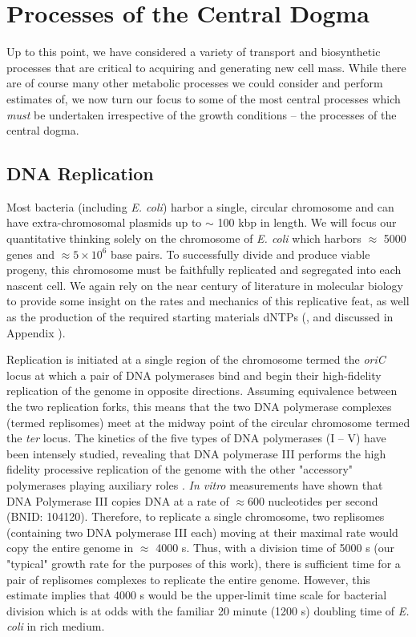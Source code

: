 \section{Processes of the Central Dogma}
Up to this point, we have considered a variety of transport and biosynthetic
processes that are critical to acquiring and generating new cell mass. While
there are of course many other metabolic processes we could consider and
perform estimates of, we now turn our focus to some of the most central processes
which \textit{must} be undertaken irrespective of the growth conditions --
the processes of the central dogma.


\subsection{DNA Replication}
Most bacteria (including \textit{E. coli}) harbor a single, circular chromosome
and can have extra-chromosomal plasmids up to $\sim$ 100 kbp in length. We will focus
our quantitative thinking solely on the chromosome of \textit{E. coli} which
harbors $\approx$ 5000 genes and $\approx 5\times 10^6$ base pairs. To
successfully divide and produce viable progeny, this chromosome must be
faithfully replicated and segregated into each nascent cell. We again rely on
the near century of literature in molecular biology to provide some insight on
the rates and mechanics of this replicative feat, as well as the production of the
required starting materials dNTPs (, and discussed in Appendix ).


Replication is initiated at a
single region of the chromosome termed the \textit{oriC} locus at which a pair
of DNA polymerases bind and begin their high-fidelity replication of the genome
in opposite directions. Assuming equivalence between the two replication forks,
this means that the two DNA polymerase complexes (termed replisomes) meet at the
midway point of the circular chromosome termed the \textit{ter} locus. The
kinetics of the five types of DNA polymerases (I -- V) have been intensely
studied, revealing that DNA polymerase III performs the high fidelity processive
replication of the genome with the other "accessory" polymerases playing
auxiliary roles \citep{fijalkowska2012}. \textit{In vitro} measurements have
shown that DNA Polymerase III copies DNA at a rate of $\approx 600$ nucleotides
per second (BNID: 104120). Therefore, to replicate a single
chromosome, two replisomes (containing two DNA polymerase III each) moving at their maximal rate would copy the
entire genome in $\approx$ 4000 s. Thus, with a division time of 5000 s (our
"typical" growth rate for the purposes of this work), there is sufficient time
for a pair of replisomes complexes to replicate the entire genome.
However, this estimate implies that 4000 s would be the upper-limit time scale
for bacterial division which is at odds with the familiar 20 minute (1200 s)
doubling time of \textit{E. coli} in rich medium.


